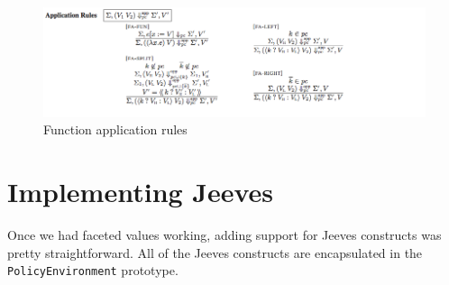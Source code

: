 \begin{figure}
  \includegraphics[scale=0.5, frame]{images/appRules}
  \caption{Function application rules~\cite{FacetedJeeves}}
  \label{fig:appRules}
\end{figure}

\section{Implementing Jeeves}
Once we had faceted values working, adding support for Jeeves constructs was pretty
straightforward. All of the Jeeves constructs are encapsulated in the \texttt{PolicyEnvironment}
prototype.

